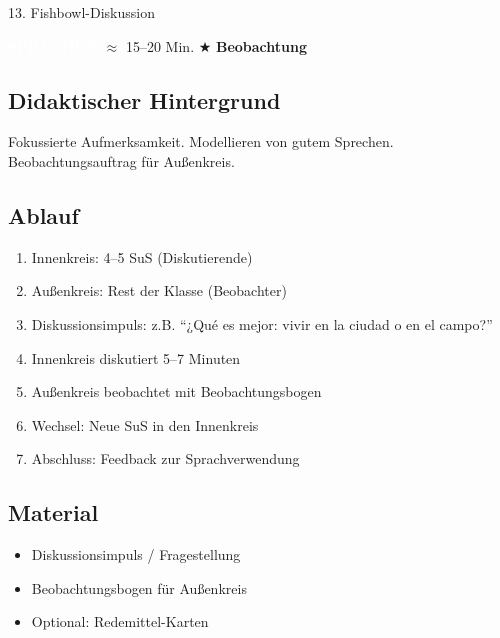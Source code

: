 \documentclass[11pt, a4paper]{article}
\newcommand{\tagSprechen}{\colorbox{sprechen}{\textcolor{white}{\footnotesize\textbf{SPRECHEN}}}}
\newcommand{\zeit}[1]{\textcolor{grau}{\footnotesize $\approx$ #1 Min.}}
\newcommand{\beobachtung}{\textcolor{erfolg}{\footnotesize $\bigstar$ \textbf{Beobachtung}}}
\begin{document}
\begin{methode}{13. Fishbowl-Diskussion}

\tagSprechen{} \zeit{15--20} \hfill \beobachtung

\subsection*{Didaktischer Hintergrund}
Fokussierte Aufmerksamkeit. Modellieren von gutem Sprechen. Beobachtungsauftrag für Außenkreis.

\subsection*{Ablauf}
\begin{enumerate}[leftmargin=*]
    \item Innenkreis: 4--5 SuS (Diskutierende)
    \item Außenkreis: Rest der Klasse (Beobachter)
    \item Diskussionsimpuls: z.B. ``¿Qué es mejor: vivir en la ciudad o en el campo?''
    \item Innenkreis diskutiert 5--7 Minuten
    \item Außenkreis beobachtet mit Beobachtungsbogen
    \item Wechsel: Neue SuS in den Innenkreis
    \item Abschluss: Feedback zur Sprachverwendung
\end{enumerate}

\subsection*{Material}
\begin{materialbox}
\begin{itemize}[label=$\square$, leftmargin=*]
    \item Diskussionsimpuls / Fragestellung
    \item Beobachtungsbogen für Außenkreis
    \item Optional: Redemittel-Karten
\end{itemize}


\end{materialbox}
\end{methode}
\end{document}
